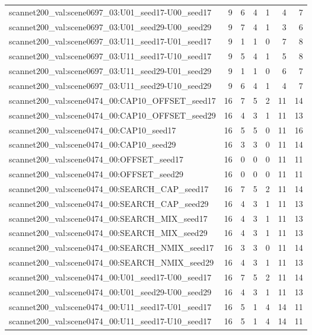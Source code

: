 \begin{table}[t]
\begin{tabular}{lrrrrrr}
scannet200\_val:scene0697\_03:U01\_seed17-U00\_seed17 & 9 & 6 & 4 & 1 & 4 & 7 \\
scannet200\_val:scene0697\_03:U01\_seed29-U00\_seed29 & 9 & 7 & 4 & 1 & 3 & 6 \\
scannet200\_val:scene0697\_03:U11\_seed17-U01\_seed17 & 9 & 1 & 1 & 0 & 7 & 8 \\
scannet200\_val:scene0697\_03:U11\_seed17-U10\_seed17 & 9 & 5 & 4 & 1 & 5 & 8 \\
scannet200\_val:scene0697\_03:U11\_seed29-U01\_seed29 & 9 & 1 & 1 & 0 & 6 & 7 \\
scannet200\_val:scene0697\_03:U11\_seed29-U10\_seed29 & 9 & 6 & 4 & 1 & 4 & 7 \\
scannet200\_val:scene0474\_00:CAP10\_OFFSET\_seed17 & 16 & 7 & 5 & 2 & 11 & 14 \\
scannet200\_val:scene0474\_00:CAP10\_OFFSET\_seed29 & 16 & 4 & 3 & 1 & 11 & 13 \\
scannet200\_val:scene0474\_00:CAP10\_seed17 & 16 & 5 & 5 & 0 & 11 & 16 \\
scannet200\_val:scene0474\_00:CAP10\_seed29 & 16 & 3 & 3 & 0 & 11 & 14 \\
scannet200\_val:scene0474\_00:OFFSET\_seed17 & 16 & 0 & 0 & 0 & 11 & 11 \\
scannet200\_val:scene0474\_00:OFFSET\_seed29 & 16 & 0 & 0 & 0 & 11 & 11 \\
scannet200\_val:scene0474\_00:SEARCH\_CAP\_seed17 & 16 & 7 & 5 & 2 & 11 & 14 \\
scannet200\_val:scene0474\_00:SEARCH\_CAP\_seed29 & 16 & 4 & 3 & 1 & 11 & 13 \\
scannet200\_val:scene0474\_00:SEARCH\_MIX\_seed17 & 16 & 4 & 3 & 1 & 11 & 13 \\
scannet200\_val:scene0474\_00:SEARCH\_MIX\_seed29 & 16 & 4 & 3 & 1 & 11 & 13 \\
scannet200\_val:scene0474\_00:SEARCH\_NMIX\_seed17 & 16 & 3 & 3 & 0 & 11 & 14 \\
scannet200\_val:scene0474\_00:SEARCH\_NMIX\_seed29 & 16 & 4 & 3 & 1 & 11 & 13 \\
scannet200\_val:scene0474\_00:U01\_seed17-U00\_seed17 & 16 & 7 & 5 & 2 & 11 & 14 \\
scannet200\_val:scene0474\_00:U01\_seed29-U00\_seed29 & 16 & 4 & 3 & 1 & 11 & 13 \\
scannet200\_val:scene0474\_00:U11\_seed17-U01\_seed17 & 16 & 5 & 1 & 4 & 14 & 11 \\
scannet200\_val:scene0474\_00:U11\_seed17-U10\_seed17 & 16 & 5 & 1 & 4 & 14 & 11 \\

\end{tabular}
\end{table}
